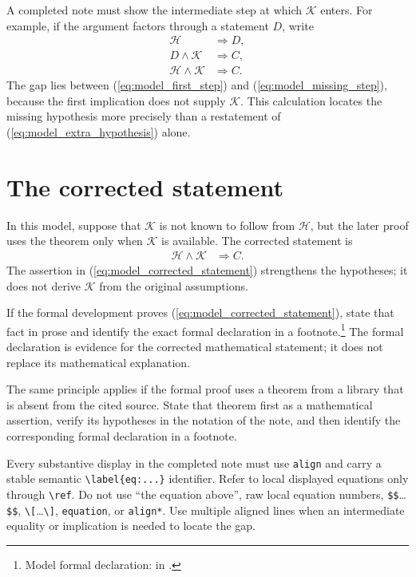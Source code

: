 \documentclass{article}
\providecommand{\leanid}[1]{\textsf{\detokenize{#1}}}
\providecommand{\doclink}[1]{%
    \href{https://sirui-lu.com/QICLean/docs/#1.html}{\path{#1}}}
\begin{document}
A completed note must show the intermediate step at which $\mathcal K$ enters.
For example, if the argument factors through a statement $D$, write
\begin{align}
    \mathcal H
        &\Longrightarrow D,
    \label{eq:model_first_step}\\
    D\wedge\mathcal K
        &\Longrightarrow C,
    \label{eq:model_missing_step}\\
    \mathcal H\wedge\mathcal K
        &\Longrightarrow C.
    \label{eq:model_derived_claim}
\end{align}
The gap lies between (\ref{eq:model_first_step}) and
(\ref{eq:model_missing_step}), because the first implication does not supply
$\mathcal K$. This calculation locates the missing hypothesis more precisely
than a restatement of (\ref{eq:model_extra_hypothesis}) alone.

\section{The corrected statement}

In this model, suppose that $\mathcal K$ is not known to follow from
$\mathcal H$, but the later proof uses the theorem only when $\mathcal K$ is
available. The corrected statement is
\begin{align}
    \mathcal H\wedge\mathcal K &\Longrightarrow C.
    \label{eq:model_corrected_statement}
\end{align}
The assertion in (\ref{eq:model_corrected_statement}) strengthens the
hypotheses; it does not derive $\mathcal K$ from the original assumptions.

If the formal development proves (\ref{eq:model_corrected_statement}), state
that fact in prose and identify the exact formal declaration in a
footnote.\footnote{Model formal declaration:
    \leanid{modelCorrected} in \doclink{QICLean/Path/To/File}.}
The formal declaration is evidence for the corrected mathematical statement; it
does not replace its mathematical explanation.

The same principle applies if the formal proof uses a theorem from a library
that is absent from the cited source. State that theorem first as a mathematical
assertion, verify its hypotheses in the notation of the note, and then identify
the corresponding formal declaration in a footnote.

Every substantive display in the completed note must use \verb|align| and carry
a stable semantic \verb|\label{eq:...}| identifier. Refer to local displayed
equations only through \verb|\ref|. Do not use ``the equation above'', raw
local equation numbers, \verb|$$|\ldots\verb|$$|,
\verb|\[|\ldots\verb|\]|, \verb|equation|, or \verb|align*|. Use multiple
aligned lines when an intermediate equality or implication is needed to locate
the gap.
\end{document}
